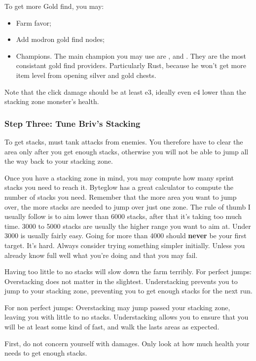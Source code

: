 \documentclass{article}
\begin{document}
To get more Gold find, you may:
\begin{itemize}
    \item Farm favor;
    \item Add modron gold find nodes;
    \item Champions.
    The main champion you may use are \rust, \jarlaxle and \azaka.
    They are the most consistant gold find providers.
    Particularly Rust, because he won't get more item level from opening silver and gold chests.
\end{itemize}

Note that the click damage should be at least e3, ideally even e4 lower than the stacking zone monster's health.

\subsubsection{Step Three: Tune Briv's Stacking}
\label{sec:stepThree}

To get stacks, \briv must tank attacks from enemies.
You therefore have to clear the area only after you get enough stacks, otherwise you will not be able to jump all the way back to your stacking zone.


Once you have a stacking zone in mind, you may compute how many sprint stacks you need to reach it.
Byteglow has a great calculator to compute the number of stacks you need.
Remember that the more area you want to jump over, the more stacks are needed to jump over just one zone.
The rule of thumb I usually follow is to aim lower than 6000 stacks, after that it's taking too much time.
3000 to 5000 stacks are usually the higher range you want to aim at.
Under 3000 is usually fairly easy.
Going for more than 4000 should \textbf{never} be your first target.
It's hard.
Always consider trying something simpler initially.
Unless you already know full well what you're doing and that you may fail.

Having too little to no stacks will slow down the farm terribly.
For perfect jumps:
    Overstacking does not matter in the slightest.
    Understacking prevents you to jump to your stacking zone, preventing you to get enough stacks for the next run.

For non perfect jumps:
    Overstacking may jump passed your stacking zone, leaving you with little to no stacks.
    Understacking allows you to ensure that you will be at least some kind of fast, and walk the lasts areas as expected.

First, do not concern yourself with damages.
Only look at how much health your \briv needs to get enough stacks.
\end{document}
